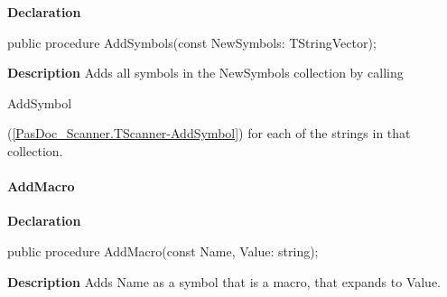 \documentclass{report}
\newif\ifpdf
\begin{document}
\label{PasDoc_Scanner.TScanner-AddSymbols}
\begin{list}{}{
\setlength{\itemindent}{0cm}
\setlength{\listparindent}{0cm}
\setlength{\leftmargin}{\evensidemargin}
\addtolength{\leftmargin}{\tmplength}
\settowidth{\labelsep}{X}
\addtolength{\leftmargin}{\labelsep}
\setlength{\labelwidth}{\tmplength}
}
\item[\textbf{Declaration}\hfill]
\ifpdf
\begin{flushleft}
\fi
\begin{ttfamily}
public procedure AddSymbols(const NewSymbols: TStringVector);\end{ttfamily}

\ifpdf
\end{flushleft}
\fi

\par
\item[\textbf{Description}]
Adds all symbols in the NewSymbols collection by calling \begin{ttfamily}AddSymbol\end{ttfamily}(\ref{PasDoc_Scanner.TScanner-AddSymbol}) for each of the strings in that collection.

\end{list}
\paragraph*{AddMacro}\hspace*{\fill}

\label{PasDoc_Scanner.TScanner-AddMacro}
\begin{list}{}{
\setlength{\itemindent}{0cm}
\setlength{\listparindent}{0cm}
\setlength{\leftmargin}{\evensidemargin}
\addtolength{\leftmargin}{\tmplength}
\settowidth{\labelsep}{X}
\addtolength{\leftmargin}{\labelsep}
\setlength{\labelwidth}{\tmplength}
}
\item[\textbf{Declaration}\hfill]
\ifpdf
\begin{flushleft}
\fi
\begin{ttfamily}
public procedure AddMacro(const Name, Value: string);\end{ttfamily}

\ifpdf
\end{flushleft}
\fi

\par
\item[\textbf{Description}]
Adds Name as a symbol that is a macro, that expands to Value.

\end{list}
\end{document}
